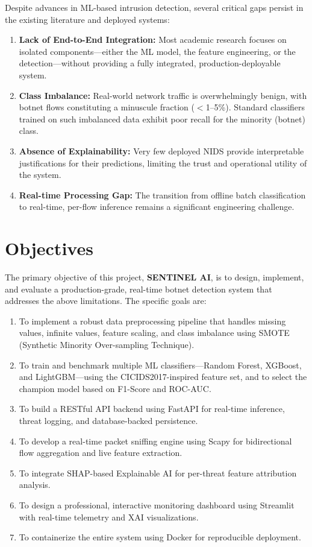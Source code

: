Despite advances in ML-based intrusion detection, several critical gaps persist in the existing literature and deployed systems:

\begin{enumerate}
    \item \textbf{Lack of End-to-End Integration:} Most academic research focuses on isolated components---either the ML model, the feature engineering, or the detection---without providing a fully integrated, production-deployable system.
    \item \textbf{Class Imbalance:} Real-world network traffic is overwhelmingly benign, with botnet flows constituting a minuscule fraction ($<$1--5\%). Standard classifiers trained on such imbalanced data exhibit poor recall for the minority (botnet) class.
    \item \textbf{Absence of Explainability:} Very few deployed NIDS provide interpretable justifications for their predictions, limiting the trust and operational utility of the system.
    \item \textbf{Real-time Processing Gap:} The transition from offline batch classification to real-time, per-flow inference remains a significant engineering challenge.
\end{enumerate}

\section{Objectives}

The primary objective of this project, \textbf{SENTINEL AI}, is to design, implement, and evaluate a production-grade, real-time botnet detection system that addresses the above limitations. The specific goals are:

\begin{enumerate}
    \item To implement a robust data preprocessing pipeline that handles missing values, infinite values, feature scaling, and class imbalance using SMOTE (Synthetic Minority Over-sampling Technique).
    \item To train and benchmark multiple ML classifiers---Random Forest, XGBoost, and LightGBM---using the CICIDS2017-inspired feature set, and to select the champion model based on F1-Score and ROC-AUC.
    \item To build a RESTful API backend using FastAPI for real-time inference, threat logging, and database-backed persistence.
    \item To develop a real-time packet sniffing engine using Scapy for bidirectional flow aggregation and live feature extraction.
    \item To integrate SHAP-based Explainable AI for per-threat feature attribution analysis.
    \item To design a professional, interactive monitoring dashboard using Streamlit with real-time telemetry and XAI visualizations.
    \item To containerize the entire system using Docker for reproducible deployment.
\end{enumerate}

